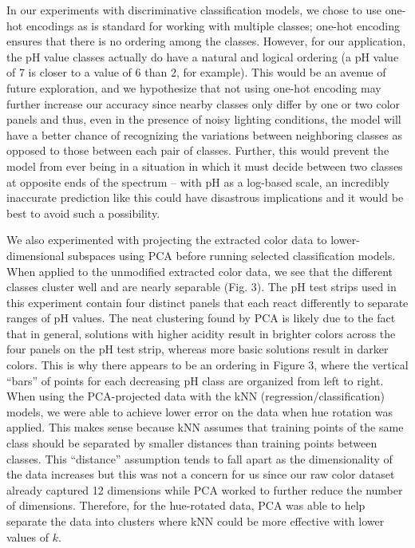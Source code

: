 \documentclass[journal]{IEEEtran}
\begin{document}
In our experiments with discriminative classification models, we chose to use one-hot encodings as is standard for working with multiple classes; one-hot encoding ensures that there is no ordering among the classes. However, for our application, the pH value classes actually do have a natural and logical ordering (a pH value of 7 is closer to a value of 6 than 2, for example). This would be an avenue of future exploration, and we hypothesize that not using one-hot encoding may further increase our accuracy since nearby classes only differ by one or two color panels and thus, even in the presence of noisy lighting conditions, the model will have a better chance of recognizing the variations between neighboring classes as opposed to those between each pair of classes. Further, this would prevent the model from ever being in a situation in which it must decide between two classes at opposite ends of the spectrum -- with pH as a log-based scale, an incredibly inaccurate prediction like this could have disastrous implications and it would be best to avoid such a possibility.

We also experimented with projecting the extracted color data to lower-dimensional subspaces using PCA before running selected classification models. When applied to the unmodified extracted color data, we see that the different classes cluster well and are nearly separable (Fig. 3). The pH test strips used in this experiment contain four distinct panels that each react differently to separate ranges of pH values. The neat clustering found by PCA is likely due to the fact that in general, solutions with higher acidity result in brighter colors across the four panels on the pH test strip, whereas more basic solutions result in darker colors. This is why there appears to be an ordering in Figure 3, where the vertical “bars” of points for each decreasing pH class are organized from left to right. When using the PCA-projected data with the kNN (regression/classification) models, we were able to achieve lower error on the data when hue rotation was applied. This makes sense because kNN assumes that training points of the same class should be separated by smaller distances than training points between classes. This “distance” assumption tends to fall apart as the dimensionality of the data increases but this was not a concern for us since our raw color dataset already captured 12 dimensions while PCA worked to further reduce the number of dimensions. Therefore, for the hue-rotated data, PCA was able to help separate the data into clusters where kNN could be more effective with lower values of $k$. 
\end{document}
